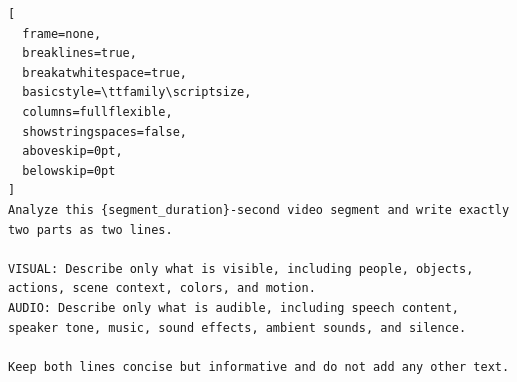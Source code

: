 \begin{tcolorbox}[
  colback=blue!3!white,
  colframe=blue!70!black,
  width=\linewidth,
  arc=1mm,
  boxrule=0.45pt,
  boxsep=0.8mm,
  left=1.6mm,
  right=1.6mm,
  top=1.2mm,
  bottom=1.2mm,
  title=\textbf{Modality Specific Captioning},
  colbacktitle=blue!70!black,
  coltitle=white,
  fonttitle=\scriptsize\bfseries\sffamily,
  halign title=center
]
\setlength{\parindent}{0pt}
\begin{lstlisting}[
  frame=none,
  breaklines=true,
  breakatwhitespace=true,
  basicstyle=\ttfamily\scriptsize,
  columns=fullflexible,
  showstringspaces=false,
  aboveskip=0pt,
  belowskip=0pt
]
Analyze this {segment_duration}-second video segment and write exactly two parts as two lines.

VISUAL: Describe only what is visible, including people, objects, actions, scene context, colors, and motion.
AUDIO: Describe only what is audible, including speech content, speaker tone, music, sound effects, ambient sounds, and silence.

Keep both lines concise but informative and do not add any other text.
\end{lstlisting}
\end{tcolorbox}
